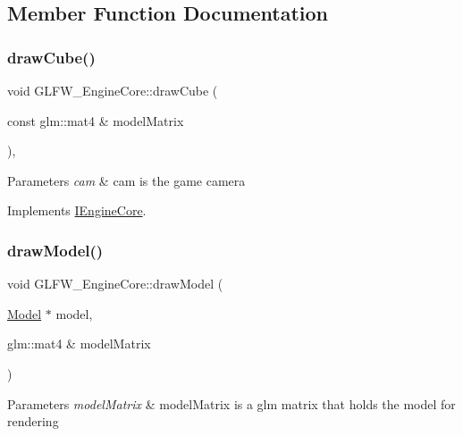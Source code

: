 \subsection{Member Function Documentation}
\mbox{\label{class_g_l_f_w___engine_core_a728d1f6ffd1e8526611ab0856db537c0}} 
\subsubsection{\texorpdfstring{drawCube()}{drawCube()}}
{\footnotesize\ttfamily void G\+L\+F\+W\+\_\+\+Engine\+Core\+::draw\+Cube (\begin{DoxyParamCaption}\item[{const glm\+::mat4 \&}]{model\+Matrix }\end{DoxyParamCaption})\hspace{0.3cm}{\ttfamily [override]}, {\ttfamily [virtual]}}


\begin{DoxyParams}{Parameters}
{\em cam} & cam is the game camera \\
\hline
\end{DoxyParams}


Implements \mbox{\hyperlink{class_i_engine_core}{I\+Engine\+Core}}.

\mbox{\label{class_g_l_f_w___engine_core_a568f74989d1e203658a6fe43140a0283}} 
\subsubsection{\texorpdfstring{drawModel()}{drawModel()}}
{\footnotesize\ttfamily void G\+L\+F\+W\+\_\+\+Engine\+Core\+::draw\+Model (\begin{DoxyParamCaption}\item[{\mbox{\hyperlink{class_model}{Model}} $\ast$}]{model,  }\item[{glm\+::mat4 \&}]{model\+Matrix }\end{DoxyParamCaption})\hspace{0.3cm}{\ttfamily [virtual]}}


\begin{DoxyParams}{Parameters}
{\em model\+Matrix} & model\+Matrix is a glm matrix that holds the model for rendering \\
\hline
\end{DoxyParams}


